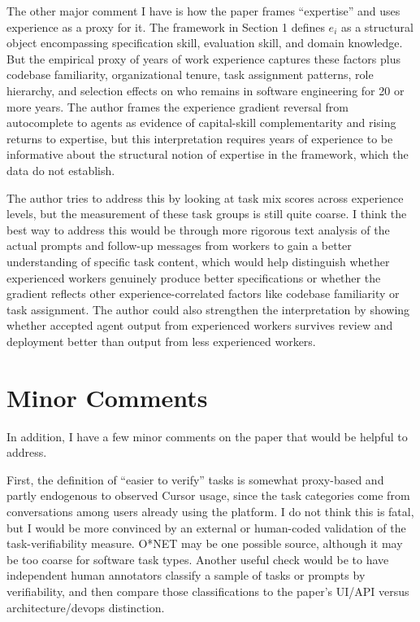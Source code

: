 \documentclass{article}
\begin{document}
The other major comment I have is how the paper frames ``expertise'' and uses experience as a proxy for it.
The framework in Section 1 defines $e_i$ as a structural object encompassing specification skill, evaluation skill, and domain knowledge.
But the empirical proxy of years of work experience captures these factors plus codebase familiarity, organizational tenure, task assignment patterns, role hierarchy, and selection effects on who remains in software engineering for 20 or more years.
The author frames the experience gradient reversal from autocomplete to agents as evidence of capital-skill complementarity and rising returns to expertise, but this interpretation requires years of experience to be informative about the structural notion of expertise in the framework, which the data do not establish.

The author tries to address this by looking at task mix scores across experience levels, but the measurement of these task groups is still quite coarse.
I think the best way to address this would be through more rigorous text analysis of the actual prompts and follow-up messages from workers to gain a better understanding of specific task content, which would help distinguish whether experienced workers genuinely produce better specifications or whether the gradient reflects other experience-correlated factors like codebase familiarity or task assignment.
The author could also strengthen the interpretation by showing whether accepted agent output from experienced workers survives review and deployment better than output from less experienced workers.


\section*{Minor Comments}

In addition, I have a few minor comments on the paper that would be helpful to address.

First, the definition of ``easier to verify'' tasks is somewhat proxy-based and partly endogenous to observed Cursor usage, since the task categories come from conversations among users already using the platform.
I do not think this is fatal, but I would be more convinced by an external or human-coded validation of the task-verifiability measure.
O*NET may be one possible source, although it may be too coarse for software task types.
Another useful check would be to have independent human annotators classify a sample of tasks or prompts by verifiability, and then compare those classifications to the paper's UI/API versus architecture/devops distinction.
\end{document}
